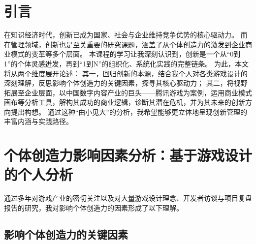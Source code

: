 \documentclass[supercite]{HustGSClassPaper}
\begin{document}
	\tableofcontents
	
	\clearpage%
	
	\section{引言}
	在知识经济时代，创新已成为国家、社会与企业维持竞争优势的核心驱动力。
	而在管理领域，创新也是至关重要的研究课题，涵盖了从个体创造力的激发到企业商业模式的变革等多个层面。
	本课程的学习让我深刻认识到，创新是一个从“0到1”的个体灵感迸发，再到“1到N”的组织化、系统化实践的完整链条。
	为此，本文将从两个维度展开论述：
	其一，回归创新的本源，结合我个人对各类游戏设计的深刻理解，反思影响个体创造力的关键因素，探寻其核心驱动力；
	其二，将视野拓展至企业层面，以中国数字内容产业的巨头——腾讯游戏为案例，运用商业模式画布等分析工具，解构其成功的商业逻辑，诊断其潜在危机，并为其未来的创新方向提出构想。
	通过这种“由小见大”的分析，我希望能够更立体地呈现创新管理的丰富内涵与实践路径。

	\section{个体创造力影响因素分析：基于游戏设计的个人分析}

	通过多年对游戏产业的密切关注以及对大量游戏设计理念、开发者访谈与项目复盘报告的研究，我对影响个体创造力的因素形成了以下理解。
	
	\subsection{影响个体创造力的关键因素}
\end{document}
